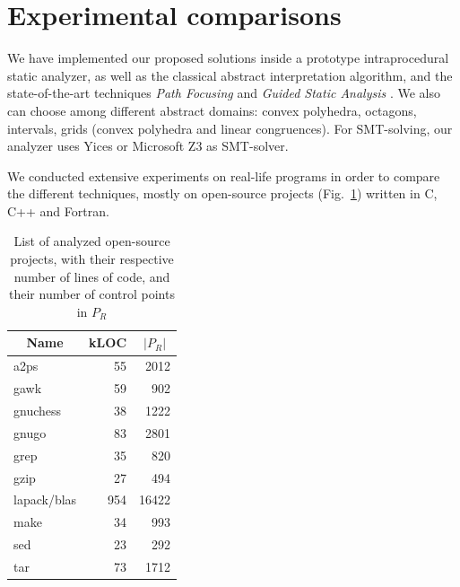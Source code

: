\documentclass[preprint]{sigplanconf}
\begin{document}
\section{Experimental comparisons}
\label{sec:experiments}

We have implemented our proposed solutions inside a prototype intraprocedural
static analyzer,
as well as the classical abstract interpretation algorithm, and the state-of-the-art
techniques \emph{Path Focusing} \cite{Monniaux_Gonnord_SAS11} and \emph{Guided
Static Analysis} \cite{DBLP:conf/sas/GopanR07}.
We also can choose among different abstract domains: convex polyhedra, octagons,
intervals, grids (convex polyhedra and linear congruences).
For SMT-solving, our analyzer uses Yices
\cite{DBLP:conf/cav/DutertreM06} or Microsoft Z3\cite{DBLP:conf/tacas/MouraB08}
as SMT-solver.

We conducted extensive experiments on real-life programs in order to compare the
different techniques, mostly on open-source projects (Fig.~\ref{fig:projects}) written in C, C++ and Fortran.

\begin{table}[!h]
	\centering
\begin{tabular}{|l|r|r|} \hline
	\multicolumn{1}{|c|}{Name} &
        \multicolumn{1}{c|}{kLOC} &
        \multicolumn{1}{c|}{$|P_R|$} \\ \hline
	a2ps & 55 & 2012\\
	gawk & 59 & 902\\ 
	gnuchess & 38 & 1222\\ 
	gnugo & 83 & 2801\\
	grep & 35 & 820\\
	gzip & 27 & 494\\
	lapack/blas & 954 & 16422\\
	make & 34 & 993\\ 
	sed & 23 & 292\\
	tar & 73 & 1712\\
	\hline
\end{tabular}
\caption{List of analyzed open-source projects, with their respective number of
lines of code, and their number of control points in $P_R$}
\label{fig:projects}
\end{table}
\end{document}

